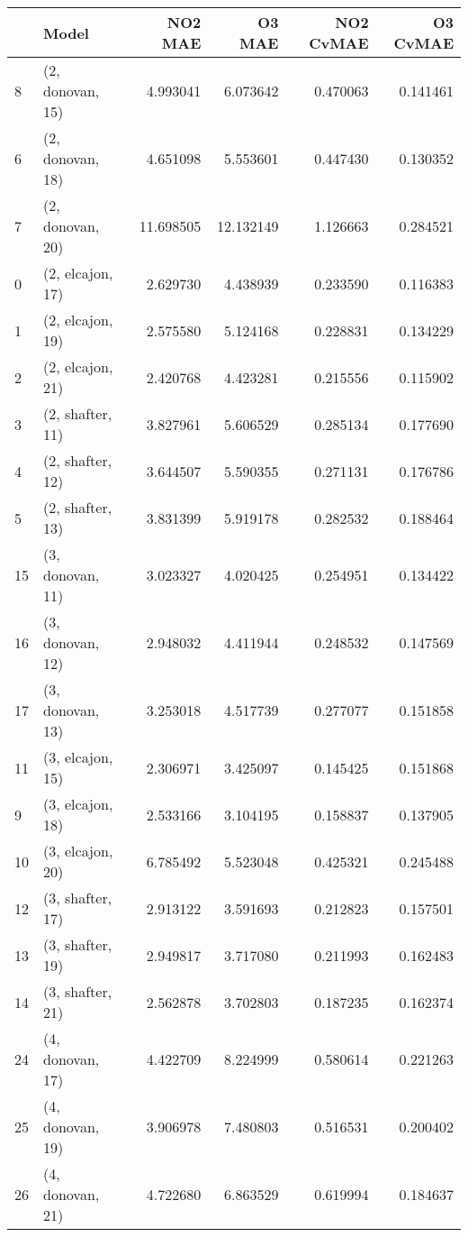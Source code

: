 \begin{tabular}{llrrrr}
\toprule
{} &             Model &    NO2 MAE &     O3 MAE &  NO2 CvMAE &  O3 CvMAE \\
\midrule
8  &  (2, donovan, 15) &   4.993041 &   6.073642 &   0.470063 &  0.141461 \\
6  &  (2, donovan, 18) &   4.651098 &   5.553601 &   0.447430 &  0.130352 \\
7  &  (2, donovan, 20) &  11.698505 &  12.132149 &   1.126663 &  0.284521 \\
0  &  (2, elcajon, 17) &   2.629730 &   4.438939 &   0.233590 &  0.116383 \\
1  &  (2, elcajon, 19) &   2.575580 &   5.124168 &   0.228831 &  0.134229 \\
2  &  (2, elcajon, 21) &   2.420768 &   4.423281 &   0.215556 &  0.115902 \\
3  &  (2, shafter, 11) &   3.827961 &   5.606529 &   0.285134 &  0.177690 \\
4  &  (2, shafter, 12) &   3.644507 &   5.590355 &   0.271131 &  0.176786 \\
5  &  (2, shafter, 13) &   3.831399 &   5.919178 &   0.282532 &  0.188464 \\
15 &  (3, donovan, 11) &   3.023327 &   4.020425 &   0.254951 &  0.134422 \\
16 &  (3, donovan, 12) &   2.948032 &   4.411944 &   0.248532 &  0.147569 \\
17 &  (3, donovan, 13) &   3.253018 &   4.517739 &   0.277077 &  0.151858 \\
11 &  (3, elcajon, 15) &   2.306971 &   3.425097 &   0.145425 &  0.151868 \\
9  &  (3, elcajon, 18) &   2.533166 &   3.104195 &   0.158837 &  0.137905 \\
10 &  (3, elcajon, 20) &   6.785492 &   5.523048 &   0.425321 &  0.245488 \\
12 &  (3, shafter, 17) &   2.913122 &   3.591693 &   0.212823 &  0.157501 \\
13 &  (3, shafter, 19) &   2.949817 &   3.717080 &   0.211993 &  0.162483 \\
14 &  (3, shafter, 21) &   2.562878 &   3.702803 &   0.187235 &  0.162374 \\
24 &  (4, donovan, 17) &   4.422709 &   8.224999 &   0.580614 &  0.221263 \\
25 &  (4, donovan, 19) &   3.906978 &   7.480803 &   0.516531 &  0.200402 \\
26 &  (4, donovan, 21) &   4.722680 &   6.863529 &   0.619994 &  0.184637 \\

\end{tabular}
